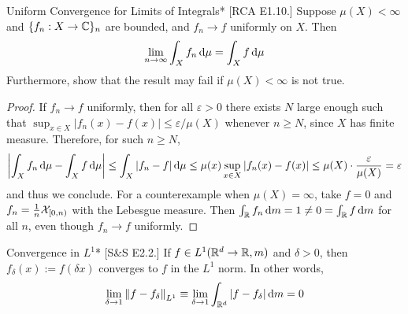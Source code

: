 \begin{problem}{Uniform Convergence for Limits of Integrals}*
    [RCA E1.10.] Suppose \(\mu(X) < \infty\) and \(\{f_n : X \to \mathbb{C}\}_n\) are bounded, and \(f_n \to f\) uniformly on \(X\). Then 
    \[
    \lim_{n \to \infty} \int_X f_n \, \mathrm{d}\mu = \int_X f \, \mathrm{d}\mu
    \]
    Furthermore, show that the result may fail if \(\mu(X) < \infty\) is not true. 
\end{problem}

\begin{proof}
    If \(f_n \to f\) uniformly, then for all \(\varepsilon > 0\) there exists \(N\) large enough such that \(\sup_{x \in X} |f_n(x) - f(x)| \leq \varepsilon / \mu(X)\) whenever \(n \geq N\), since \(X\) has finite measure. Therefore, for such \(n \geq N\), 
    \[
    \left| \int_X f_n \, \mathrm{d}\mu - \int_X f \, \mathrm{d}\mu \right| 
    \leq \int_X |f_n - f| \, \mathrm{d}\mu 
    \leq \mu(x) \sup_{x \in X} |f_n(x) - f(x)|
    \leq \mu(X) \cdot \frac{\varepsilon}{\mu(X)}
    = \varepsilon
    \]
    and thus we conclude. For a counterexample when \(\mu(X) = \infty\), take \(f = 0\) and \(f_n = \frac{1}{n} \mathcal{X}_{[0, n)}\) with the Lebesgue measure. Then \(\int_{\mathbb{R}} f_n \, \mathrm{d}m = 1 \neq 0 = \int_{\mathbb{R}} f \, \mathrm{d}m \) for all \(n\), even though \(f_n \to f\) uniformly. 
\end{proof}

\begin{problem}{Convergence in \(L^1\)}*
    [S\&S E2.2.] If \(f \in L^1(\mathbb{R}^d \to \mathbb{R}, m)\) and \(\delta > 0\), then \(f_\delta(x) := f(\delta x)\) converges to \(f\) in the \(L^1\) norm. In other words, 
    \[
    \lim_{\delta \to 1} \norm{ f - f_\delta }_{L^1} 
    \equiv \lim_{\delta \to 1} \int_{\mathbb{R}^d} |f - f_\delta| \, \mathrm{d}m = 0
    \]
\end{problem}

